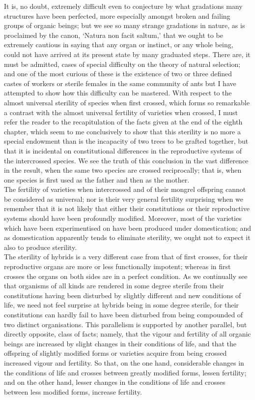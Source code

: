 \indent It is, no doubt, extremely difficult even to conjecture by what gradations many structures have been perfected, more especially amongst broken and failing groups of organic beings; but we see so many strange gradations in nature, as is proclaimed by the canon, `Natura non facit saltum,' that we ought to be extremely cautious in saying that any organ or instinct, or any whole being, could not have arrived at its present state by many graduated steps.  There are, it must be admitted, cases of special difficulty on the theory of natural selection; and one of the most curious of these is the existence of two or three defined castes of workers or sterile females in the same community of ants but I have attempted to show how this difficulty can be mastered.  With respect to the almost universal sterility of species when first crossed, which forms so remarkable a contrast with the almost universal fertility of varieties when crossed, I must refer the reader to the recapitulation of the facts given at the end of the eighth chapter, which seem to me conclusively to show that this sterility is no more a special endowment than is the incapacity of two trees to be grafted together, but that it is incidental on constitutional differences in the reproductive systems of the intercrossed species. We see the truth of this conclusion in the vast difference in the result, when the same two species are crossed reciprocally; that is, when one species is first used as the father and then as the mother.~\\
\indent The fertility of varieties when intercrossed and of their mongrel offspring cannot be considered as universal; nor is their very general fertility surprising when we remember that it is not likely that either their constitutions or their reproductive systems should have been profoundly modified. Moreover, most of the varieties which have been experimentised on have been produced under domestication; and as domestication apparently tends to eliminate sterility, we ought not to expect it also to produce sterility.~\\
\indent The sterility of hybrids is a very different case from that of first crosses, for their reproductive organs are more or less functionally impotent; whereas in first crosses the organs on both sides are in a perfect condition. As we continually see that organisms of all kinds are rendered in some degree sterile from their constitutions having been disturbed by slightly different and new conditions of life, we need not feel surprise at hybrids being in some degree sterile, for their constitutions can hardly fail to have been disturbed from being compounded of two distinct organisations. This parallelism is supported by another parallel, but directly opposite, class of facts; namely, that the vigour and fertility of all organic beings are increased by slight changes in their conditions of life, and that the offspring of slightly modified forms or varieties acquire from being crossed increased vigour and fertility.  So that, on the one hand, considerable changes in the conditions of life and crosses between greatly modified forms, lessen fertility; and on the other hand, lesser changes in the conditions of life and crosses between less modified forms, increase fertility.~\\
